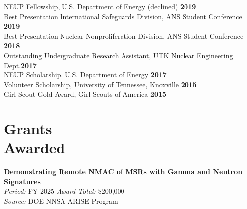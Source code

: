 \documentclass[margin,line]{resume}
\begin{document}
\begin{resume}
        NEUP Fellowship, U.S. Department of Energy (declined) \hfill \textbf{2019}\vspace{0.5mm}\\
        Best Presentation International Safeguards Division, ANS Student Conference \hfill \textbf{2019}\vspace{0.5mm}\\%
        Best Presentation Nuclear Nonproliferation Division, ANS Student Conference \hfill \textbf{2018}\vspace{0.5mm}\\%
        Outstanding Undergraduate Research Assistant, UTK Nuclear Engineering Dept.\hfill \textbf{2017}\vspace{.5mm}\\%
        NEUP Scholarship, U.S. Department of Energy \hfill \textbf{2017}\vspace{0.5mm}\\
        Volunteer Scholarship, University of Tennessee, Knoxville \hfill \textbf{2015}\vspace{0.5mm}\\
        Girl Scout Gold Award, Girl Scouts of America \hfill \textbf{2015}

    \section{\mysidestyle Grants\\Awarded}
    \textbf{Demonstrating Remote NMAC of MSRs with Gamma and Neutron Signatures} \\
    \textsl{Period:} FY 2025 \hfill \textsl{Award Total:} \$200,000\\
    \textsl{Source:} DOE-NNSA ARISE Program \hfill\\


\end{resume}
\end{document}
